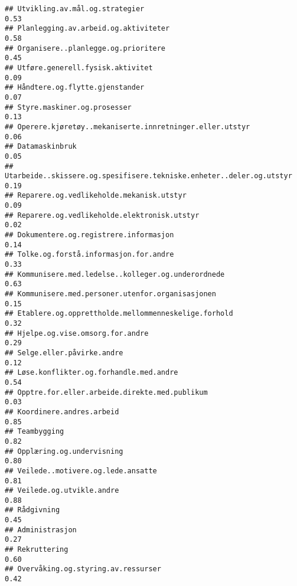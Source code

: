 \documentclass[
]{article}
\begin{document}
\begin{verbatim}
## Utvikling.av.mål.og.strategier                                                    0.53
## Planlegging.av.arbeid.og.aktiviteter                                              0.58
## Organisere..planlegge.og.prioritere                                               0.45
## Utføre.generell.fysisk.aktivitet                                                  0.09
## Håndtere.og.flytte.gjenstander                                                    0.07
## Styre.maskiner.og.prosesser                                                       0.13
## Operere.kjøretøy..mekaniserte.innretninger.eller.utstyr                           0.06
## Datamaskinbruk                                                                    0.05
## Utarbeide..skissere.og.spesifisere.tekniske.enheter..deler.og.utstyr              0.19
## Reparere.og.vedlikeholde.mekanisk.utstyr                                          0.09
## Reparere.og.vedlikeholde.elektronisk.utstyr                                       0.02
## Dokumentere.og.registrere.informasjon                                             0.14
## Tolke.og.forstå.informasjon.for.andre                                             0.33
## Kommunisere.med.ledelse..kolleger.og.underordnede                                 0.63
## Kommunisere.med.personer.utenfor.organisasjonen                                   0.15
## Etablere.og.opprettholde.mellommenneskelige.forhold                               0.32
## Hjelpe.og.vise.omsorg.for.andre                                                   0.29
## Selge.eller.påvirke.andre                                                         0.12
## Løse.konflikter.og.forhandle.med.andre                                            0.54
## Opptre.for.eller.arbeide.direkte.med.publikum                                     0.03
## Koordinere.andres.arbeid                                                          0.85
## Teambygging                                                                       0.82
## Opplæring.og.undervisning                                                         0.80
## Veilede..motivere.og.lede.ansatte                                                 0.81
## Veilede.og.utvikle.andre                                                          0.88
## Rådgivning                                                                        0.45
## Administrasjon                                                                    0.27
## Rekruttering                                                                      0.60
## Overvåking.og.styring.av.ressurser                                                0.42

\end{verbatim}
\end{document}
